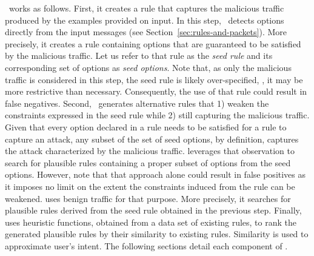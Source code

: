 \documentclass[conference]{IEEEtran}
\begin{document}
\tname\ works as follows. First, it creates a rule that captures the
malicious traffic produced by the examples provided on input. In this
step, \tname\ detects options directly from the input messages (see
Section~\ref{sec:rules-and-packets}). More precisely, it creates a
rule containing options that are guaranteed to be satisfied by the
malicious traffic. Let us refer to that rule as the \emph{seed rule}
and its corresponding set of options as \emph{seed options}. Note
that, as only the malicious traffic is considered in this step, the
seed rule is likely over-specified, \ie{}, it may be more restrictive
than necessary. Consequently, the use of that rule could result in
false negatives. Second, \tname\ generates alternative rules that 1)
weaken the constraints expressed in the seed rule while 2) still
capturing the malicious traffic. Given that every option declared in a
rule needs to be satisfied for a rule to capture an attack, any subset
of the set of seed options, by definition, captures the attack
characterized by the malicious traffic. \tname{} leverages that
observation to search for plausible rules containing a proper subset
of options from the seed options. However, note that that approach
alone could result in false positives as it imposes no limit on the
extent the constraints induced from the rule can be weakened. \tname{}
uses benign traffic for that purpose. More precisely, it searches for
plausible rules derived from the seed rule obtained in the previous
step. Finally, \tname{} uses heuristic functions, obtained from a data
set of existing rules, to rank the generated plausible rules by their
similarity to existing rules. Similarity is used to approximate user's
intent. The following sections detail each component of \tname.




\end{document}
